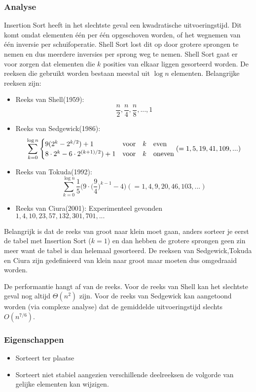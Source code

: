 \documentclass{report}
\begin{document}
\subsubsection{Analyse}
Insertion Sort heeft in het slechtste geval een kwadratische uitvoeringstijd. Dit komt omdat elementen één per één opgeschoven worden, of het wegnemen van één inversie per schuifoperatie. Shell Sort lost dit op door grotere sprongen te nemen en dus meerdere inversies per sprong weg te nemen. Shell Sort gaat er voor zorgen dat elementen die $k$ posities van elkaar liggen gesorteerd worden. De reeksen die gebruikt worden bestaan meestal uit $\log n$ elementen. Belangrijke reeksen zijn:
\begin{itemize}
 \item Reeks van Shell(1959): $${\frac{n}{2},\frac{n}{4},\frac{n}{8},..., 1}$$
 \item Reeks van Sedgewick(1986): $$\sum_{k = 0}^{\log n} \begin{cases}
                                    9(2^k - 2^{k/2}) + 1 & \hbox{voor} \quad k \quad \hbox{even}\\
                                    8\cdot2^k - 6\cdot2^{(k+1)/2}) + 1 & \hbox{voor} \quad k \quad \hbox{oneven}
                                   \end{cases} (= 1, 5, 19, 41, 109, ...)$$ 
 \item Reeks van Tokuda(1992): $$\sum_{k = 0}^{\log n} \frac{1}{5}\bigg(9\cdot\bigg(\frac{9}{4}\bigg)^{k - 1} - 4\bigg) (= 1, 4, 9, 20, 46, 103, ...)$$
 \item Reeks van Ciura(2001): Experimenteel gevonden $1, 4, 10, 23, 57, 132, 301, 701, ...$
\end{itemize}
Belangrijk is dat de reeks van groot naar klein moet gaan, anders sorteer je eerst de tabel met Insertion Sort ($k = 1$) en dan hebben de grotere sprongen geen zin meer want de tabel is dan helemaal gesorteerd. De reeksen van Sedgewick,Tokuda en Ciura zijn gedefinieerd van klein naar groot maar moeten dus omgedraaid worden.

De performantie hangt af van de reeks. Voor de reeks van Shell kan het slechtste geval nog altijd $\Theta(n^2)$ zijn. Voor de reeks van Sedgewick kan aangetoond worden (via complexe analyse) dat de gemiddelde uitvoeringstijd slechts $O(n^{7/6})$. 
\subsubsection{Eigenschappen}
\begin{itemize}
 \item Sorteert ter plaatse
 \item Sorteert niet stabiel aangezien verschillende deelreeksen de volgorde van gelijke elementen kan wijzigen.
\end{itemize}
\end{document}
